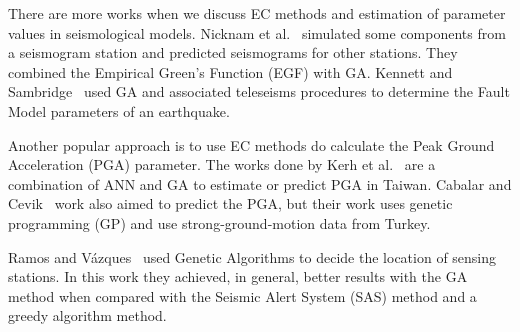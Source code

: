 There are more works when we discuss EC methods and estimation of
parameter values in seismological models. Nicknam et
al.~\cite{Nicknam2010} simulated some components from a seismogram
station and predicted seismograms for other stations. They combined
the Empirical Green’s Function (EGF) with GA. Kennett and
Sambridge~\cite{Kennett1992} used GA and associated teleseisms
procedures to determine the Fault Model parameters of an
earthquake.

Another popular approach is to use EC methods do calculate the Peak
Ground Acceleration (PGA) parameter. The works done by Kerh et
al.~\cite{Kerh2010, Kerh2015} are a combination of ANN and GA to
estimate or predict PGA in Taiwan. Cabalar and
Cevik~\cite{Cabalar2009} work also aimed to predict the PGA, but their
work uses genetic programming (GP) and use strong-ground-motion data
from Turkey.

 
Ramos and Vázques~\cite{Ramos2011} used Genetic Algorithms to decide
the location of sensing stations. In this work they achieved, in
general, better results with the GA method when compared with the
Seismic Alert System (SAS) method and a greedy algorithm
method.




